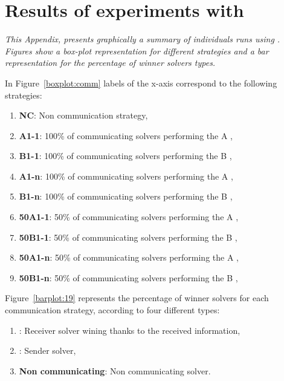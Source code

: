 \chapter{Results of experiments with \carrp}
\label{app:cap}
\textit{This Appendix, presents graphically a summary of individuals runs using \carrp. Figures show a \textit{box-plot} representation for different strategies and a bar representation for the percentage of winner solvers types.}
\vfill
\newpage

In Figure~\ref{boxplot:comm} labels of the x-axis correspond to the following strategies:
\begin{enumerate}[itemsep=-1mm]
\item \textbf{NC}: Non communication strategy, 
\item \textbf{A1-1}: 100\% of communicating solvers performing the \commstr{} A \oneTone, 
\item \textbf{B1-1}: 100\% of communicating solvers performing the \commstr{} B \oneTone,
\item \textbf{A1-n}: 100\% of communicating solvers performing the \commstr{} A \oneTn,
\item \textbf{B1-n}: 100\% of communicating solvers performing the \commstr{} B \oneTn,
\item \textbf{50A1-1}: 50\% of communicating solvers performing the \commstr{} A \oneTone, 
\item \textbf{50B1-1}: 50\% of communicating solvers performing the \commstr{} B \oneTone,
\item \textbf{50A1-n}: 50\% of communicating solvers performing the \commstr{} A \oneTn,
\item \textbf{50B1-n}: 50\% of communicating solvers performing the \commstr{} B \oneTn,
\end{enumerate}

Figure~\ref{barplot:19} represents the percentage of winner solvers for each communication strategy, according to four different types:
\begin{enumerate}[itemsep=-1mm]
\item {}: Receiver solver wining thanks to the received information, 
\item {}: Sender solver, 
\item \textbf{Non communicating}: Non communicating solver.
\end{enumerate}

